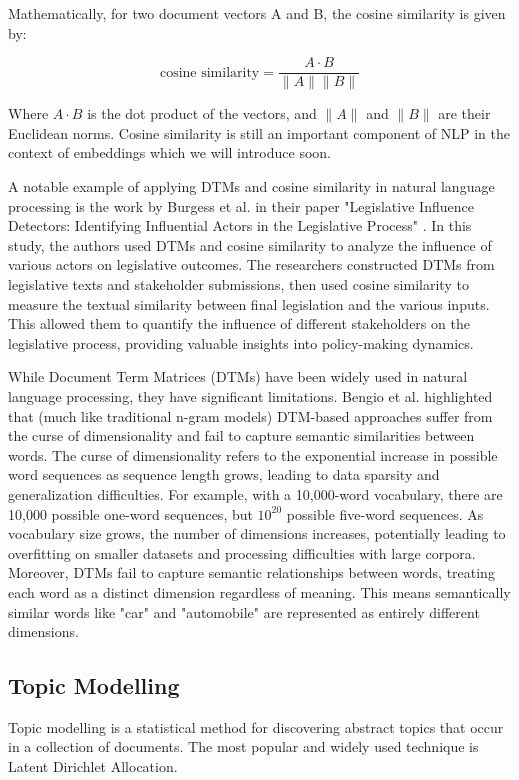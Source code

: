 \documentclass[a4paper, oneside]{discothesis}
\begin{document}
Mathematically, for two document vectors A and B, the cosine similarity is given by:

\begin{equation}
\text{cosine similarity} = \frac{A \cdot B}{\|A\| \|B\|}
\end{equation}

Where $A \cdot B$ is the dot product of the vectors, and $\|A\|$ and $\|B\|$ are their Euclidean norms. Cosine similarity is still an important component of NLP in the context of embeddings which we will introduce soon. 

A notable example of applying DTMs and cosine similarity in natural language processing is the work by Burgess et al. in their paper "Legislative Influence Detectors: Identifying Influential Actors in the Legislative Process" \cite{burgess2016legislative}. In this study, the authors used DTMs and cosine similarity to analyze the influence of various actors on legislative outcomes.
The researchers constructed DTMs from legislative texts and stakeholder submissions, then used cosine similarity to measure the textual similarity between final legislation and the various inputs. This allowed them to quantify the influence of different stakeholders on the legislative process, providing valuable insights into policy-making dynamics.

While Document Term Matrices (DTMs) have been widely used in natural language processing, they have significant limitations. Bengio et al. \cite{bengio2003neural} highlighted that (much like traditional n-gram models) DTM-based approaches suffer from the curse of dimensionality and fail to capture semantic similarities between words.
The curse of dimensionality refers to the exponential increase in possible word sequences as sequence length grows, leading to data sparsity and generalization difficulties. For example, with a 10,000-word vocabulary, there are 10,000 possible one-word sequences, but $10^{20}$ possible five-word sequences.
As vocabulary size grows, the number of dimensions increases, potentially leading to overfitting on smaller datasets and processing difficulties with large corpora. Moreover, DTMs fail to capture semantic relationships between words, treating each word as a distinct dimension regardless of meaning. 
This means semantically similar words like "car" and "automobile" are represented as entirely different dimensions.

\subsection{Topic Modelling}
Topic modelling is a statistical method for discovering abstract topics that occur in a collection of documents. The most popular and widely used technique is Latent Dirichlet Allocation.
\end{document}
